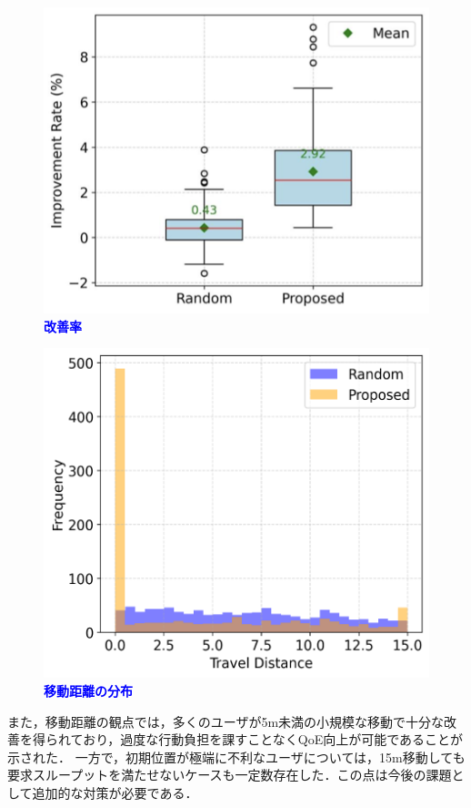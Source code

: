 \documentclass[dvipdfmx,twocolumn]{jsarticle}
\newcommand{\Note}[1]{\noindent \textbf{\textcolor{blue}{#1}}}
\begin{document}
\begin{figure}[H]
 \centering
 \includegraphics[width=\linewidth]{boxplot_50_50.png}
 \caption{\Note{改善率}}
\end{figure}
\begin{figure}[H]
 \centering
 \includegraphics[width=\linewidth]{hist.png}
 \caption{\Note{移動距離の分布}}
\end{figure}
また，移動距離の観点では，多くのユーザが5m未満の小規模な移動で十分な改善を得られており，過度な行動負担を課すことなくQoE向上が可能であることが示された．
一方で，初期位置が極端に不利なユーザについては，15m移動しても要求スループットを満たせないケースも一定数存在した．この点は今後の課題として追加的な対策が必要である．
\end{document}
